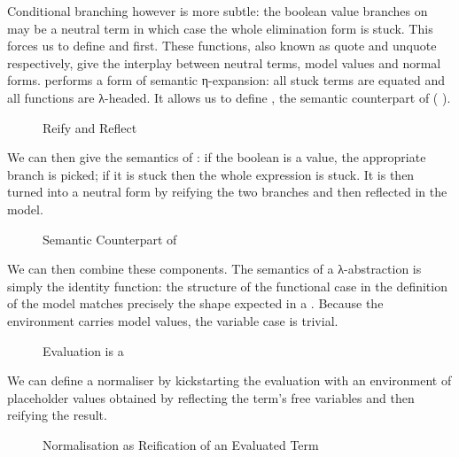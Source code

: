Conditional branching however is more subtle: the boolean value  branches on
may be a neutral term in which case the whole elimination form is stuck. This forces
us to define  and  first. These functions, also known as quote
and unquote respectively, give the interplay between neutral terms, model values and
normal forms.  performs a form of semantic η-expansion: all stuck 
terms are equated and all functions are λ-headed. It allows us to define , the
semantic counterpart of ( ).

\begin{figure}[h]
\caption{Reify and Reflect\label{fig:reifyreflectnbe}}
\end{figure}

We can then give the semantics of : if the boolean is a value, the
appropriate branch is picked; if it is stuck then the whole expression is stuck.
It is then turned into a neutral form by reifying the two branches and then reflected
in the model.

\begin{figure}[h]
\caption{Semantic Counterpart of \label{fig:nbeifte}}
\end{figure}

We can then combine these components. The semantics of a λ-abstraction is simply the
identity function: the structure of the functional case in the definition of the model
matches precisely the shape expected in a . Because the environment
carries model values, the variable case is trivial.

\begin{figure}[h]
\caption{Evaluation is a \label{fig:evalnbe}}
\end{figure}

We can define a normaliser by kickstarting the evaluation with an environment of
placeholder values obtained by reflecting the term's free variables and then reifying
the result.

\begin{figure}[h]
\caption{Normalisation as Reification of an Evaluated Term\label{fig:normnbe}}
\end{figure}

